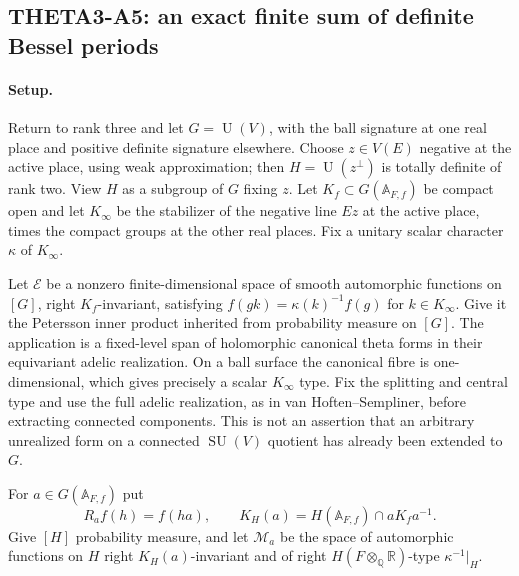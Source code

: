 \documentclass[11pt]{article}
\newcommand{\Q}{\mathbb Q}
\newcommand{\R}{\mathbb R}
\newcommand{\A}{\mathbb A}
\newcommand{\SU}{\operatorname{SU}}
\newcommand{\U}{\operatorname{U}}
\begin{document}
\subsection{THETA3-A5: an exact finite sum of definite Bessel periods}\label{A5}

\paragraph{Setup.}
Return to rank three and let $G=\U(V)$, with the ball signature at one
real place and positive definite signature elsewhere. Choose
$z\in V(E)$ negative at the active place, using weak approximation;
then $H=\U(z^\perp)$ is totally definite of rank two. View $H$ as a
subgroup of $G$ fixing $z$. Let $K_f\subset G(\A_{F,f})$ be compact
open and let $K_\infty$ be the stabilizer of the negative line $Ez$ at
the active place, times the compact groups at the other real places.
Fix a unitary scalar character $\kappa$ of $K_\infty$.

Let $\mathcal E$ be a nonzero finite-dimensional space of smooth
automorphic functions on $[G]$, right $K_f$-invariant, satisfying
$f(gk)=\kappa(k)^{-1}f(g)$ for $k\in K_\infty$. Give it the
Petersson inner product inherited from probability measure on $[G]$.
The application is a fixed-level span of holomorphic canonical theta
forms in their equivariant adelic realization. On a ball surface the
canonical fibre is one-dimensional, which gives precisely a scalar
$K_\infty$ type. Fix the splitting and central type and use the full
adelic realization, as in van Hoften--Sempliner, before extracting
connected components. This is not an assertion that an arbitrary
unrealized form on a connected $\SU(V)$ quotient has already been
extended to $G$.

For $a\in G(\A_{F,f})$ put
\[
 R_af(h)=f(ha),\qquad
 K_H(a)=H(\A_{F,f})\cap aK_fa^{-1}.
\]
Give $[H]$ probability measure, and let $\mathcal M_a$ be the space of
automorphic functions on $H$ right $K_H(a)$-invariant and of right
$H(F\otimes_\Q\R)$-type $\kappa^{-1}|_H$.
\end{document}

